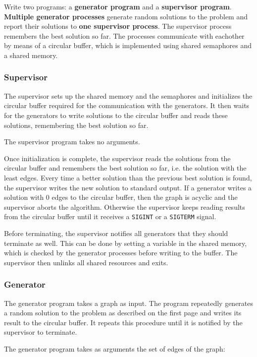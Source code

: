 Write two programs: a \textbf{generator program} and a \textbf{supervisor program}.
\textbf{Multiple generator processes} generate random solutions to the problem
and report their solutions to \textbf{one supervisor process}.
The supervisor process remembers the best solution so far.
The processes communicate with eachother by means of a circular buffer,
which is implemented using shared semaphores and a shared memory.

\subsubsection*{Supervisor}

The supervisor sets up the shared memory and the semaphores
and initializes the circular buffer
required for the communication with the generators.
It then waits for the generators to write solutions to the circular buffer
and reads these solutions, remembering the best solution so far.

The supervisor program takes no arguments.

Once initialization is complete,
the supervisor reads the solutions from the circular buffer
and remembers the best solution so far, i.e. the solution with the least edges.
Every time a better solution than the previous best solution is found,
the supervisor writes the new solution to standard output.
If a generator writes a solution with 0 edges to the circular buffer,
then the graph is acyclic and the supervisor aborts the algorithm.
Otherwise the supervisor keeps reading results from the circular buffer
until it receives a \texttt{SIGINT} or a \texttt{SIGTERM} signal.

Before terminating, the supervisor notifies all generators
that they should terminate as well.
This can be done by setting a variable in the shared memory,
which is checked by the generator processes before writing to the buffer.
The supervisor then unlinks all shared resources and exits.

\subsubsection*{Generator}

The generator program takes a graph as input.
The program repeatedly generates a random solution to the problem as described on the first page
and writes its result to the circular buffer.
It repeats this procedure until it is notified by the supervisor to terminate.

The generator program takes as arguments the set of edges of the graph:


